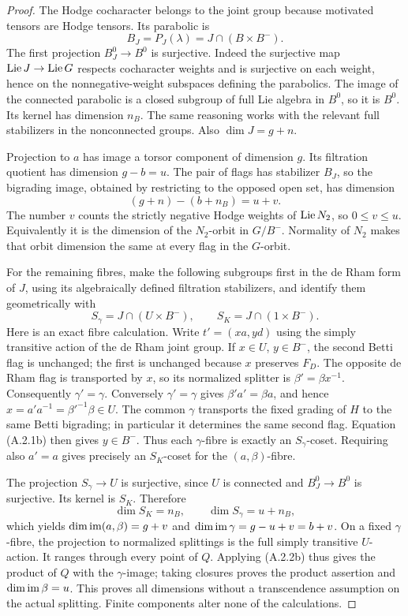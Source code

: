 \begin{proof}
The Hodge cocharacter belongs to the joint group because motivated
tensors are Hodge tensors. Its parabolic is
\[
                   B_J=P_J(\lambda)=J\cap(B\times B^-).
\]
The first projection $B_J^0\to B^0$ is surjective. Indeed the
surjective map $\operatorname{Lie} J\to\operatorname{Lie} G$ respects cocharacter weights and
is surjective on each weight, hence on the nonnegative-weight
subspaces defining the parabolics. The image of the connected
parabolic is a closed subgroup of full Lie algebra in $B^0$, so it
is $B^0$. Its kernel has dimension $n_B$. The same reasoning works
with the relevant full stabilizers in the nonconnected groups.
Also $\dim J=g+n$.

Projection to $a$ has image a torsor component of dimension $g$.
Its filtration quotient has dimension $g-b=u$. The pair of flags
has stabilizer $B_J$, so the bigrading image, obtained by restricting
to the opposed open set, has dimension
\[
 (g+n)-(b+n_B)=u+v.
\]
The number $v$ counts the strictly negative Hodge weights of
$\operatorname{Lie} N_2$, so $0\leq v\leq u$. Equivalently it is the dimension
of the $N_2$-orbit in $G/B^-$. Normality of $N_2$ makes that orbit
dimension the same at every flag in the $G$-orbit.

For the remaining fibres, make the following subgroups first in the
de Rham form of $J$, using its algebraically defined filtration
stabilizers, and identify them geometrically with
\[
 S_\gamma=J\cap(U\times B^-),\qquad
 S_K=J\cap(1\times B^-).
\]
Here is an exact fibre calculation. Write $t'=(xa,yd)$ using the
simply transitive action of the de Rham joint group. If
$x\in U$, $y\in B^-$, the second Betti flag is unchanged; the
first is unchanged because $x$ preserves $F_D$. The opposite de Rham
flag is transported by $x$, so its normalized splitter is
$\beta'=\beta x^{-1}$. Consequently $\gamma'=\gamma$.
Conversely $\gamma'=\gamma$ gives
$\beta'a'=\beta a$, and hence
$x=a'a^{-1}=\beta'^{-1}\beta\in U$. The common $\gamma$
transports the fixed grading of $H$ to the same Betti bigrading;
in particular it determines the same second flag. Equation
(A.2.1b) then gives $y\in B^-$. Thus each $\gamma$-fibre is exactly
an $S_\gamma$-coset. Requiring also $a'=a$ gives precisely an
$S_K$-coset for the $(a,\beta)$-fibre.

The projection $S_\gamma\to U$ is surjective, since $U$ is
connected and $B_J^0\to B^0$ is surjective. Its kernel is $S_K$.
Therefore
\[
 \dim S_K=n_B,\qquad \dim S_\gamma=u+n_B,
\]
which yields $\dim\operatorname{im}(a,\beta)=g+v$ and
$\dim\operatorname{im}\gamma=g-u+v=b+v$. On a fixed $\gamma$-fibre, the
projection to normalized splittings is the full simply transitive
$U$-action. It ranges through every point of $Q$. Applying
(A.2.2b) thus gives the product of $Q$ with the $\gamma$-image;
taking closures proves the product assertion and
$\dim\operatorname{im}\beta=u$. This proves all dimensions without a
transcendence assumption on the actual splitting. Finite components
alter none of the calculations.
\end{proof}

